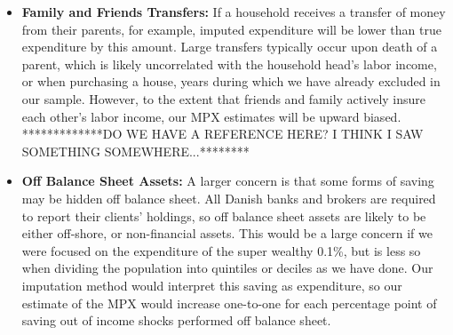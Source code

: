 \documentclass[titlepage]{\econtex}\newcommand{\texname}{ConsumptionHeterogeneity}
\begin{document}
\begin{itemize}
	\item \textbf{Family and Friends Transfers:} If a household receives a transfer of money from their parents, for example, imputed expenditure will be lower than true expenditure by this amount. Large transfers typically occur upon death of a parent, which is likely uncorrelated with the household head's labor income, or when purchasing a house, years during which we have already excluded in our sample. However, to the extent that friends and family actively insure each other's labor income, our MPX estimates will be upward biased. *************DO WE HAVE A REFERENCE HERE? I THINK I SAW SOMETHING SOMEWHERE...********
	\item \textbf{Off Balance Sheet Assets:} A larger concern is that some forms of saving may be hidden off balance sheet. All Danish banks and brokers are required to report their clients' holdings, so off balance sheet assets are likely to be either off-shore, or non-financial assets. This would be a large concern if we were focused on the expenditure of the super wealthy 0.1\%, but is less so when dividing the population into quintiles or deciles as we have done. Our imputation method would interpret this saving as expenditure, so our estimate of the MPX would increase one-to-one for each percentage point of saving out of income shocks performed off balance sheet.
\end{itemize}
\end{document}
